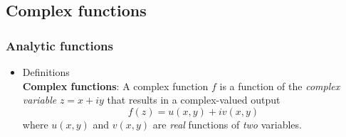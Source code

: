 \subsection{Complex functions}

\subsubsection{Analytic functions}
\begin{itemize}
	\item Definitions\\
	\textbf{Complex functions}: A complex function $f$ is a function of the \textit{complex variable} $z=x+iy$ that results in a complex-valued output
	$$
	f(z) = u(x,y) + iv(x,y)
	$$
	where $u(x,y)$ and $v(x,y) $ are \textit{real} functions of \textit{two} variables.
\end{itemize}